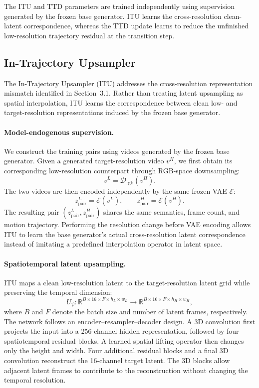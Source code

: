 \documentclass[letterpaper]{article} %
\begin{document}
The ITU and TTD parameters are trained independently using supervision
generated by the frozen base generator. ITU learns the cross-resolution
clean-latent correspondence, whereas the TTD update learns to reduce the
unfinished low-resolution trajectory residual at the transition step.

\subsection{In-Trajectory Upsampler}
\label{sec:itu}

The In-Trajectory Upsampler (ITU) addresses the cross-resolution representation
mismatch identified in Section~3.1. Rather than treating latent upsampling as
spatial interpolation, ITU learns the correspondence between clean
low- and target-resolution representations induced by the frozen base
generator.

\paragraph{Model-endogenous supervision.}
We construct the training pairs using videos generated by the frozen base
generator. Given a generated target-resolution video \(v^{H}\), we first obtain its
corresponding low-resolution counterpart through RGB-space downsampling:
\[
v^{L}=\mathcal{D}_{\mathrm{rgb}}(v^{H}).
\]
The two videos are then encoded independently by the same frozen VAE
\(\mathcal{E}\):
\[
z_{\mathrm{pair}}^{L}=\mathcal{E}(v^{L}),
\qquad
z_{\mathrm{pair}}^{H}=\mathcal{E}(v^{H}).
\]
The resulting pair
\((z_{\mathrm{pair}}^{L},z_{\mathrm{pair}}^{H})\) shares the same semantics,
frame count, and motion trajectory. Performing the resolution change before
VAE encoding allows ITU to learn the base generator's actual cross-resolution
latent correspondence instead of imitating a predefined interpolation
operator in latent space.

\paragraph{Spatiotemporal latent upsampling.}
ITU maps a clean low-resolution latent to the target-resolution latent grid
while preserving the temporal dimension:
\[
U_\psi:
\mathbb{R}^{B\times16\times F\times h_L\times w_L}
\rightarrow
\mathbb{R}^{B\times16\times F\times h_H\times w_H},
\]
where \(B\) and \(F\) denote the batch size and number of latent frames,
respectively. The network follows an encoder--resampler--decoder design. A
3D convolution first projects the input into a 256-channel hidden
representation, followed by four spatiotemporal residual blocks. A learned
spatial lifting operator then changes only the height and width. Four
additional residual blocks and a final 3D convolution reconstruct the
16-channel target latent. The 3D blocks allow adjacent latent frames to
contribute to the reconstruction without changing the temporal resolution.
\end{document}
